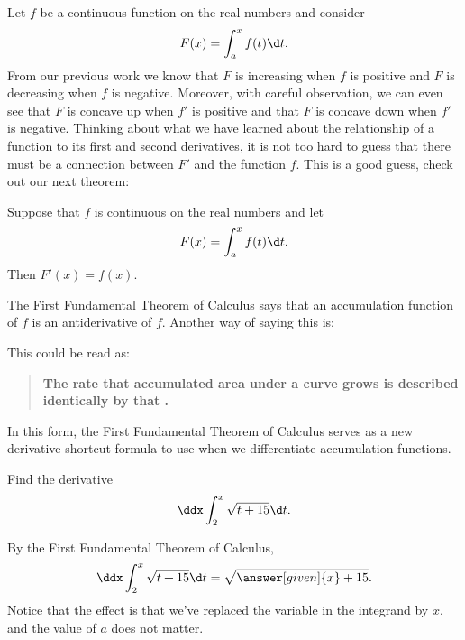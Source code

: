 \documentclass{ximera}
\begin{document}
Let $f$ be a continuous function on the real numbers and consider
\[
  F(x) = \int_a^x f(t)\d t.
\]
From our previous work we know that $F$ is increasing when $f$ is
positive and $F$ is decreasing when $f$ is negative. Moreover, with
careful observation, we can even see that $F$ is concave up when $f'$
is positive and that $F$ is concave down when $f'$ is negative.
Thinking about what we have learned about the relationship of a
function to its first and second derivatives, it is not too hard to
guess that there must be a connection between $F'$ and the function
$f$. This is a good guess, check out our next theorem:


\begin{theorem}
	Suppose that $f$ is continuous on the real numbers and let
	\[  F(x)=\int_a^x f(t)\d t. \]
	Then $F'(x)=f(x)$.
\end{theorem}

The First Fundamental Theorem of Calculus says that an accumulation
function of $f$ is an antiderivative of $f$. Another way of saying this is:
\begin{image}
\end{image}
This could be read as:
\begin{quote}\large\textbf{The \textcolor{blue!70!green}{rate} that \textcolor{green!70!black!70!blue}{accumulated area} under a  \textcolor{purple!50!blue!90!black}{curve} grows is described identically by that  \color{purple!50!blue!90!black}{curve}.}
\end{quote}
In this form, the First Fundamental Theorem of Calculus serves as a new derivative shortcut formula to use when we differentiate accumulation functions. 

\begin{example}
  Find the derivative 
  \[
 \ddx \int_2^{x} \sqrt{t+15} \d t.
  \]
  \begin{explanation}
	By the First Fundamental Theorem of Calculus, \[ \ddx \int_2^{x} \sqrt{t+15} \d t = \sqrt{\answer[given]{x}+15}. \]
	Notice that the effect is that we've replaced the variable in the integrand by $x$, and the value of $a$ does not matter.
  \end{explanation}
\end{example}
\end{document}
